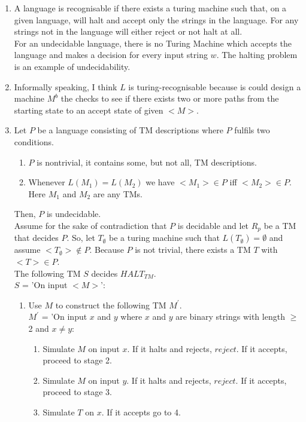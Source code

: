 \documentclass[a4paper,12pt]{article}
\begin{document}
\begin{enumerate}[label=\alph*)]
\item A language is recognisable if there exists a turing machine such that, on a given language, will halt and accept only the strings in the language. For any strings not in the language will either reject or not halt at all. \\
For an undecidable language, there is no Turing Machine which accepts the language and makes a decision for every input string $w$. The halting problem is an example of undecidability.
\item Informally speaking, I think $L$ is turing-recognisable because is could design a machine $M^{b}$ the checks to see if there exists two or more paths from the starting state to an accept state of given $<M>$.
\item Let $P$ be a language consisting of TM descriptions where $P$ fulfils two conditions. \begin{enumerate}[label=\arabic*)]
\item $P$ is nontrivial, it contains some, but not all, TM descriptions.
\item Whenever $L(M_1) = L(M_2)$ we have $<M_1> \in P$ iff $<M_2> \in P$. Here $M_1$ and $M_2$ are any TMs.
\end{enumerate}
Then, $P$ is undecidable. \\
Assume for the sake of contradiction that $P$ is decidable and let $R_p$ be a TM that decides $P$. So, let $T_{\emptyset}$ be a turing machine such that $L(T_{\emptyset})= \emptyset$ and assume $<T_{\emptyset}> \notin P$. Because $P$ is not trivial, there exists a TM $T$ with $<T> \in P$.\\
The following TM $S$ decides $HALT_{TM}$. \\
$S$ = 'On input $<M>$':
\begin{enumerate}[label=\arabic*)]
\item Use $M$ to construct the following TM $M^{'}$. \\ 
$M^{'}$ = 'On input $x$ and $y$ where $x$ and $y$ are binary strings with length $\geq$ 2 and $x \neq y$:
\begin{enumerate}[label=\arabic*)]
\item Simulate $M$ on input $x$. If it halts and rejects, $reject$. If it accepts, proceed to stage 2.
\item Simulate $M$ on input $y$. If it halts and rejects, $reject$. If it accepts, proceed to stage 3.
\item Simulate $T$ on $x$. If it accepts go to 4.

\end{enumerate}
\end{enumerate}
\end{enumerate}
\end{document}
